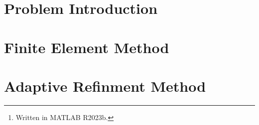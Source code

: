 \documentclass[12pt]{article}
\title{\reporttitle}
\author{Andrea Di Antonio, 858798 \\ \hyperlink{mailto:a.diantonio1@campus.unimib.it}{a.diantonio1@campus.unimib.it}}
\date{Exam session of July 27, 2023 \\ Academic Year 2022-23}
\newcommand{\reporttitle}{Adaptive 1D 1st-order Lagrange FEM}
\begin{document}
	\maketitle
	\thispagestyle{fancy}

	\begin{abstract}
		\begin{center}
            Report for the course \textit{Metodi Numerici per Equazioni alle Derivate Parziali} on the definition and costruction of an \textit{\reporttitle}\footnote{Written in MATLAB R2023b.} and a subsequent analysis which includes a comparison against a more naive approach by considering a sequence of uniformly refined meshes.
        \end{center}
	\end{abstract}

    \newpage
    \tableofcontents

    \newpage
    \section{Problem Introduction}
    

    \newpage
    \section{Finite Element Method}
    

    \newpage
    \section{Adaptive Refinment Method}
\end{document}
